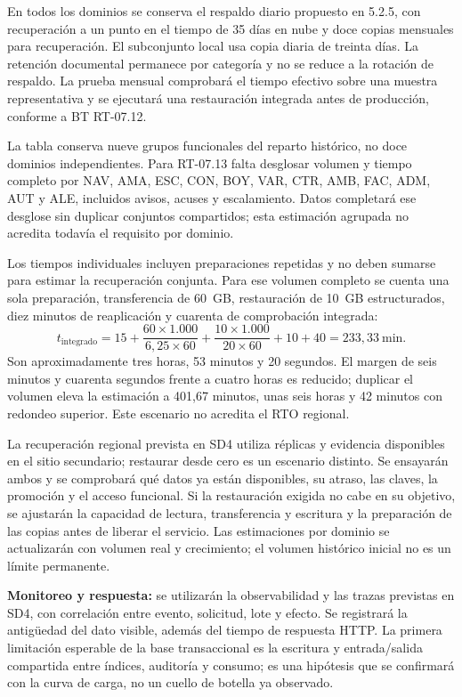 En todos los dominios se conserva el respaldo diario propuesto en 5.2.5, con recuperación a un punto en el tiempo de 35 días en nube y doce copias mensuales para recuperación. El subconjunto local usa copia diaria de treinta días. La retención documental permanece por categoría y no se reduce a la rotación de respaldo. La prueba mensual comprobará el tiempo efectivo sobre una muestra representativa y se ejecutará una restauración integrada antes de producción, conforme a BT RT-07.12.

La tabla conserva nueve grupos funcionales del reparto histórico, no doce dominios independientes. Para RT-07.13 falta desglosar volumen y tiempo completo por NAV, AMA, ESC, CON, BOY, VAR, CTR, AMB, FAC, ADM, AUT y ALE, incluidos avisos, acuses y escalamiento. Datos completará ese desglose sin duplicar conjuntos compartidos; esta estimación agrupada no acredita todavía el requisito por dominio.

Los tiempos individuales incluyen preparaciones repetidas y no deben sumarse para estimar la recuperación conjunta. Para ese volumen completo se cuenta una sola preparación, transferencia de 60~GB, restauración de 10~GB estructurados, diez minutos de reaplicación y cuarenta de comprobación integrada:
\[
t_{\mathrm{integrado}}=
15+\frac{60\times1.000}{6{,}25\times60}
+\frac{10\times1.000}{20\times60}+10+40
=233{,}33\ \mbox{min}.
\]
Son aproximadamente tres horas, 53 minutos y 20 segundos. El margen de seis minutos y cuarenta segundos frente a cuatro horas es reducido; duplicar el volumen eleva la estimación a 401,67 minutos, unas seis horas y 42 minutos con redondeo superior. Este escenario no acredita el RTO regional.

La recuperación regional prevista en SD4 utiliza réplicas y evidencia disponibles en el sitio secundario; restaurar desde cero es un escenario distinto. Se ensayarán ambos y se comprobará qué datos ya están disponibles, su atraso, las claves, la promoción y el acceso funcional. Si la restauración exigida no cabe en su objetivo, se ajustarán la capacidad de lectura, transferencia y escritura y la preparación de las copias antes de liberar el servicio. Las estimaciones por dominio se actualizarán con volumen real y crecimiento; el volumen histórico inicial no es un límite permanente.

\textbf{Monitoreo y respuesta:} se utilizarán la observabilidad y las trazas previstas en SD4, con correlación entre evento, solicitud, lote y efecto. Se registrará la antigüedad del dato visible, además del tiempo de respuesta HTTP. La primera limitación esperable de la base transaccional es la escritura y entrada/salida compartida entre índices, auditoría y consumo; es una hipótesis que se confirmará con la curva de carga, no un cuello de botella ya observado.

